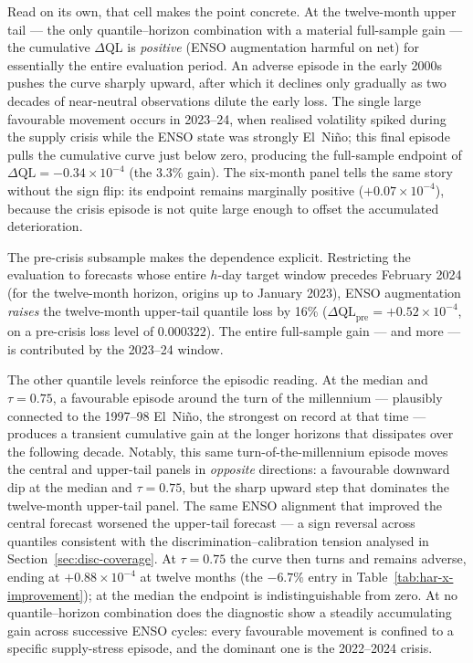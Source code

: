Read on its own, that cell makes the point concrete. At the twelve-month
upper tail --- the only quantile--horizon combination with a material
full-sample gain --- the cumulative $\Delta$QL is \emph{positive} (ENSO
augmentation harmful on net) for essentially the entire evaluation period. An adverse
episode in the early 2000s pushes the curve sharply upward, after which it
declines only gradually as two decades of near-neutral observations dilute
the early loss. The single large favourable movement occurs in 2023--24,
when realised volatility spiked during the supply crisis while the ENSO
state was strongly El~Ni\~no; this final episode pulls the cumulative
curve just below zero, producing the full-sample endpoint of
$\Delta\text{QL} = -0.34 \times 10^{-4}$ (the $3.3\%$ gain). The six-month
panel tells the same story without the sign flip: its endpoint remains
marginally positive ($+0.07 \times 10^{-4}$), because the crisis episode
is not quite large enough to offset the accumulated deterioration.

The pre-crisis subsample makes the dependence explicit. Restricting the
evaluation to forecasts whose entire $h$-day target window precedes
February 2024 (for the twelve-month horizon, origins up to January 2023),
ENSO augmentation \emph{raises} the twelve-month upper-tail quantile loss
by 16\% ($\Delta\text{QL}_{\text{pre}} = +0.52 \times 10^{-4}$, on a
pre-crisis loss level of $0.000322$). The entire full-sample gain ---
and more --- is contributed by the 2023--24 window.

The other quantile levels reinforce the episodic reading. At the median
and $\tau = 0.75$, a favourable episode around the turn of the millennium
--- plausibly connected to the 1997--98 El~Ni\~no, the strongest on record
at that time --- produces a transient cumulative gain at the longer
horizons that dissipates over the following decade. Notably, this same
turn-of-the-millennium episode moves the central and upper-tail panels in
\emph{opposite} directions: a favourable downward dip at the median and
$\tau = 0.75$, but the sharp upward step that dominates the twelve-month
upper-tail panel. The same ENSO alignment that improved the central
forecast worsened the upper-tail forecast --- a sign reversal across
quantiles consistent with the discrimination--calibration tension analysed
in Section~\ref{sec:disc-coverage}. At $\tau = 0.75$ the
curve then turns and remains adverse, ending at
$+0.88 \times 10^{-4}$ at twelve months (the $-6.7\%$ entry in
Table~\ref{tab:har-x-improvement}); at the median the endpoint is
indistinguishable from zero. At no quantile--horizon combination does the
diagnostic show a steadily accumulating gain across successive ENSO
cycles: every favourable movement is confined to a specific supply-stress
episode, and the dominant one is the 2022--2024 crisis.

